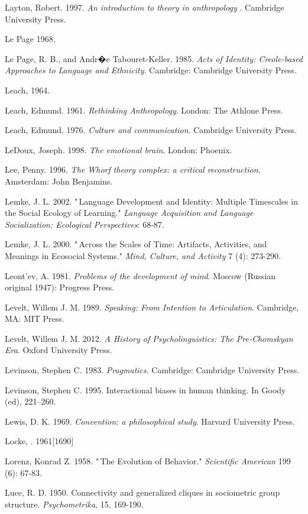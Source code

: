 Layton, Robert. 1997. \textit{An introduction to theory in anthropology
}. Cambridge University Press.

Le Page 1968.

Le Page, R. B., and Andr�e Tabouret-Keller. 1985. \textit{Acts of 
Identity: Creole-based Approaches to Language and Ethnicity}. 
Cambridge: Cambridge University Press.

Leach, 1964.

Leach, Edmund. 1961. \textit{Rethinking Anthropology}. London: The 
Athlone Press.

Leach, Edmund. 1976. \textit{Culture and communication}. Cambridge 
University Press.

LeDoux, Joseph. 1998. \textit{The emotional brain}. London: Phoenix.

Lee, Penny. 1996. \textit{The Whorf theory complex: a critical 
reconstruction}. Amsterdam: John Benjamins.

Lemke, J. L. 2002. "\,Language Development and Identity: Multiple 
Timescales in the Social Ecology of Learning." \textit{Language 
Acquisition and Language Socialization: Ecological Perspectives}: 
68-87.

Lemke, J. L. 2000. "\,Across the Scales of Time: Artifacts, Activities, 
and Meanings in Ecosocial Systems." \textit{Mind, Culture, and Activity
} 7 (4): 273-290.

Leont'ev, A. 1981. \textit{Problems of the development of mind}. 
Moscow (Russian original 1947): Progress Press.

Levelt, Willem J. M. 1989. \textit{Speaking: From Intention to 
Articulation}. Cambridge, MA: MIT Press.

Levelt, Willem J. M. 2012. \textit{A History of Psycholinguistics: The 
Pre-Chomskyan Era}. Oxford University Press.

Levinson, Stephen C. 1983. \textit{Pragmatics}. Cambridge: Cambridge 
University Press.

Levinson, Stephen C. 1995. Interactional biases in human thinking. In 
Goody (ed), 221--260.

Lewis, D. K. 1969. \textit{Convention: a philosophical study}. 
Harvard University Press.

Locke, . 1961$[$1690$]$

Lorenz, Konrad Z. 1958. "\,The Evolution of Behavior." \textit{
Scientific American} 199 (6): 67-83.

Luce, R. D. 1950. Connectivity and generalized cliques in sociometric 
group structure. \textit{Psychometrika}, 15, 169-190.

